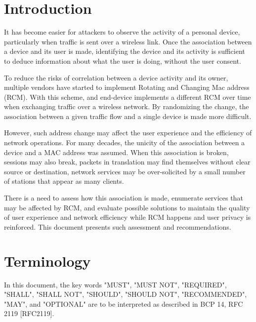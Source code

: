 \documentclass[10pt]{article}
\begin{document}
\section{Introduction}{
    It has become easier for attackers to observe the activity of a personal device, particularly when traffic is sent over a wireless link. Once the association between a device and its user is made, identifying the device and its activity is sufficient to deduce information about what the user is doing, without the user consent.
    
    To reduce the risks of correlation between a  device activity and its owner, multiple vendors have started to implement Rotating and Changing Mac address (RCM). With this scheme, and end-device implements a different RCM over time when exchanging traffic over a wireless network. By randomizing the change, the association between a given traffic flow and a single device is made more difficult. 
    
    However, such address change may affect the user experience and the efficiency of network operations. For many decades, the unicity of the association between a device and a MAC address was assumed. When this association is broken, sessions may also break, packets in translation may find themselves without clear source or destination, network services may be over-solicited by a small number of stations that appear as many clients.
    
    There is a need to assess how this association is made, enumerate services that may be affected by RCM, and evaluate possible solutions to maintain the quality of user experience and network efficiency while RCM happens and user privacy is reinforced. This document presents such assessment and recommendations.


}
\pagebreak

\section{Terminology}{
	In this document, the key words "MUST", "MUST NOT", "REQUIRED",
	"SHALL", "SHALL NOT", "SHOULD", "SHOULD NOT", "RECOMMENDED", "MAY",
	and "OPTIONAL" are to be interpreted as described in BCP 14, RFC 2119   [RFC2119].
	

}
\pagebreak
\end{document}
